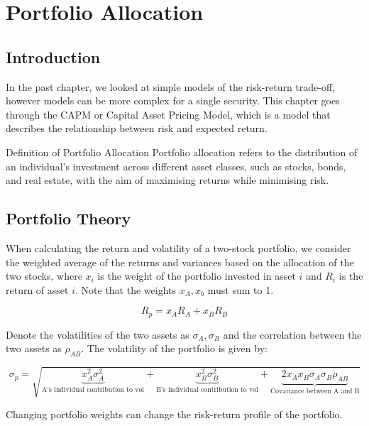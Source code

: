 \chapter{Portfolio Allocation}
\section{Introduction}

In the past chapter, we looked at simple models of the risk-return trade-off, however models can be more complex for a single security. This chapter goes through the CAPM or Capital Asset Pricing Model, which is a model that describes the relationship between risk and expected return.

\begin{definitionbox}{Definition of Portfolio Allocation}
    Portfolio allocation refers to the distribution of an individual's investment across different asset classes, such as stocks, bonds, and real estate, with the aim of maximising returns while minimising risk.
\end{definitionbox}

\section{Portfolio Theory}
When calculating the return and volatility of a two-stock portfolio, we consider the weighted average of the returns and variances based on the allocation of the two stocks, where $x_i$ is the weight of the portfolio invested in asset $i$ and $R_i$ is the return of asset $i$. Note that the weights $x_A, x_b$ must sum to 1.

\begin{equation}
    R_p = x_AR_A + x_BR_B
\end{equation}

Denote the volatilities of the two assets as $\sigma_A, \sigma_B$ and the correlation between the two assets as $\rho_{AB}$. The volatility of the portfolio is given by:

\begin{equation}
    \sigma_p = \sqrt{\underbrace{x_A^2\sigma_A^2}_{\text{A's individual contribution to vol}} + \underbrace{x_B^2\sigma_B^2}_{\text{B's individual contribution to vol}} + \underbrace{2x_Ax_B\sigma_A\sigma_B\rho_{AB}}_{\text{Covariance between A and B}}}
\end{equation}

Changing portfolio weights can change the risk-return profile of the portfolio. 

